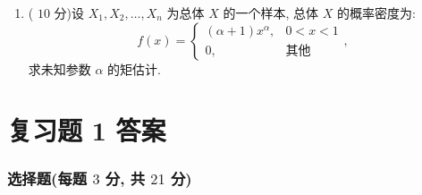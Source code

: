\begin{enumerate}
	\item ( $10$ 分)设 $X_1,X_2,\ldots,X_n$ 为总体 $X$ 的一个样本, 总体 $X$ 的概率密度为:
	\begin{equation*}
		f(x)=
		\begin{cases}
		(\alpha+1)x^\alpha, & 0<x<1\\
		0, & \text{其他}
		\end{cases},
	\end{equation*}
	求未知参数 $\alpha$ 的矩估计.
\end{enumerate}

\section{复习题 1 答案}
\subsubsection{选择题(每题 $3$ 分, 共 $21$ 分)}
